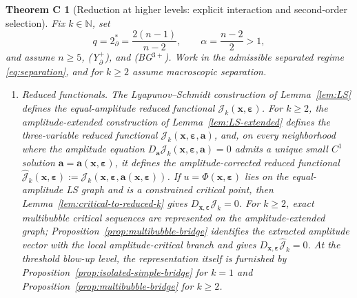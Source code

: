 \documentclass[11pt,reqno,a4paper]{amsart}
\numberwithin{equation}{section}
\theoremstyle{plain}
\theoremstyle{remark}
\theoremstyle{plain}
\newtheorem*{thmC}{Theorem C}
\begin{document}
\begin{thmC}[Reduction at higher levels: explicit interaction and second-order selection]\label{thm:intro-reduction}
Fix $k\in\mathbb N$, set
\[
q=2^*_{\partial}=\frac{2(n-1)}{n-2},
\qquad
\alpha=\frac{n-2}{2}>1,
\]
and assume $n\ge5$, \textup{(Y$^+_{\partial}$)}, and \textup{(BG$^{3+}$)}.
Work in the admissible separated regime \eqref{eq:separation}, and for $k\ge2$ assume macroscopic separation.

\begin{enumerate}[label=\textup{(\alph*)},leftmargin=1.5em]
\item \emph{Reduced functionals.}
The Lyapunov--Schmidt construction of Lemma~\ref{lem:LS} defines the equal-amplitude reduced functional
$\mathcal J_k(\mathbf x,\boldsymbol\varepsilon)$.
For $k\ge2$, the amplitude-extended construction of Lemma~\ref{lem:LS-extended} defines the three-variable reduced functional
$\mathcal J_k(\mathbf x,\boldsymbol\varepsilon,\mathbf a)$,
and, on every neighborhood where the amplitude equation
$D_{\mathbf a}\mathcal J_k(\mathbf x,\boldsymbol\varepsilon,\mathbf a)=0$
admits a unique small $C^1$ solution
$\mathbf a=\mathbf a(\mathbf x,\boldsymbol\varepsilon)$,
it defines the amplitude-corrected reduced functional
$\hat{\mathcal J}_k(\mathbf x,\boldsymbol\varepsilon)
:=\mathcal J_k(\mathbf x,\boldsymbol\varepsilon,\mathbf a(\mathbf x,\boldsymbol\varepsilon))$.
If $u=\Phi(\mathbf x,\boldsymbol\varepsilon)$ lies on the equal-amplitude LS graph and is a constrained
critical point, then Lemma~\ref{lem:critical-to-reduced-k} gives
$D_{\mathbf x,\boldsymbol\varepsilon}\mathcal J_k=0$.
For $k\ge2$, exact multibubble critical sequences are represented on the amplitude-extended graph;
Proposition~\ref{prop:multibubble-bridge} identifies the extracted amplitude vector with the local
amplitude-critical branch and gives
$D_{\mathbf x,\boldsymbol\varepsilon}\hat{\mathcal J}_k=0$.
At the threshold blow-up level, the representation itself is furnished by
Proposition~\ref{prop:isolated-simple-bridge} for $k=1$ and Proposition~\ref{prop:multibubble-bridge} for $k\ge2$.


\end{enumerate}
\end{thmC}
\end{document}
